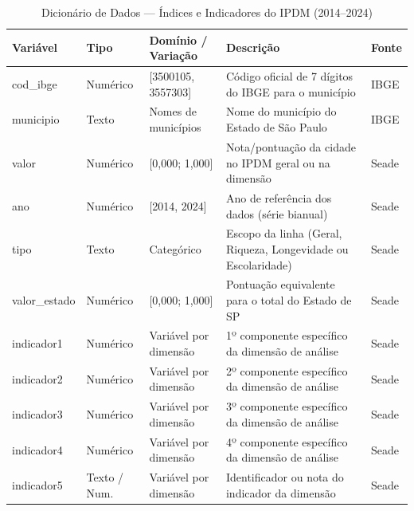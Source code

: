 \documentclass[12pt]{article}
\begin{document}
\begin{table}[htbp]
\centering
\fontsize{10pt}{13pt}\selectfont %
\renewcommand{\arraystretch}{1.15} %

\caption{Dicionário de Dados --- Índices e Indicadores do IPDM (2014--2024)}
\label{tab:dicionario_ipdm}
\vspace{0.2cm}

\begin{tabularx}{\textwidth}{>{\ttfamily}l l l X X}
\toprule
\rule{0pt}{2.5ex}\textbf{Variável} & \textbf{Tipo} & \textbf{Domínio / Variação} & \textbf{Descrição} & \textbf{Fonte} \\[0.3ex]
\midrule
cod\_ibge    & Numérico & [3500105, 3557303]    & Código oficial de 7 dígitos do IBGE para o município & IBGE \\
municipio   & Texto    & Nomes de municípios   & Nome do município do Estado de São Paulo            & IBGE \\
valor       & Numérico & [0,000; 1,000]        & Nota/pontuação da cidade no IPDM geral ou na dimensão & Seade \\
ano         & Numérico & [2014, 2024]          & Ano de referência dos dados (série bianual)          & Seade \\
tipo        & Texto    & Categórico            & Escopo da linha (Geral, Riqueza, Longevidade ou Escolaridade) & Seade \\
valor\_estado & Numérico & [0,000; 1,000]        & Pontuação equivalente para o total do Estado de SP  & Seade \\
indicador1  & Numérico & Variável por dimensão & 1º componente específico da dimensão de análise      & Seade \\
indicador2  & Numérico & Variável por dimensão & 2º componente específico da dimensão de análise      & Seade \\
indicador3  & Numérico & Variável por dimensão & 3º componente específico da dimensão de análise      & Seade \\
indicador4  & Numérico & Variável por dimensão & 4º componente específico da dimensão de análise      & Seade \\
indicador5  & Texto / Num. & Variável por dimensão & Identificador ou nota do indicador da dimensão       & Seade \\
\bottomrule
\end{tabularx}
\end{table}
\end{document}
